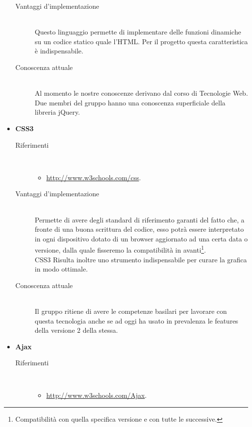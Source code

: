 \begin{itemize}
\begin{description}
		\item[Vantaggi d'implementazione]\ \\ 
		\noindent Questo linguaggio permette di implementare delle funzioni dinamiche su un codice statico quale l'\gls{HTML}. Per il progetto \PROGETTO{} questa caratteristica è indispensabile.
		
		\item[Conoscenza attuale]\ \\ 
		\noindent Al momento le nostre conoscenze derivano dal corso di Tecnologie Web. \\ Due membri del gruppo hanno una conoscenza superficiale della libreria jQuery.
	\end{description}
	
	\item \textbf{CSS3}
	\begin{description}
		\item[Riferimenti]\ 
		\noindent\begin{itemize}
			\item \url{http://www.w3schools.com/css}.
		\end{itemize}
		
		\item[Vantaggi d'implementazione]\ \\ 
		\noindent Permette di avere degli standard di riferimento garanti del fatto che, a fronte di una buona scrittura del codice, esso potrà essere interpretato in ogni dispositivo dotato di un \gls{browser} aggiornato ad una certa data o versione, dalla quale fisseremo la compatibilità in avanti\footnote{Compatibilità con quella specifica versione e con tutte le successive.}. \\ CSS3 Risulta inoltre uno strumento indispensabile per curare la grafica in modo ottimale.
		
		\item[Conoscenza attuale]\ \\ 
		\noindent Il gruppo ritiene di avere le competenze basilari per lavorare con questa tecnologia anche se ad oggi ha usato in prevalenza le features della versione 2 della stessa.
	\end{description}
	
	\item \textbf{Ajax}
	\begin{description}
		\item[Riferimenti]\ 
		\noindent\begin{itemize}
			\item \url{http://www.w3schools.com/Ajax}.
		\end{itemize}
		

\end{description}
\end{itemize}
